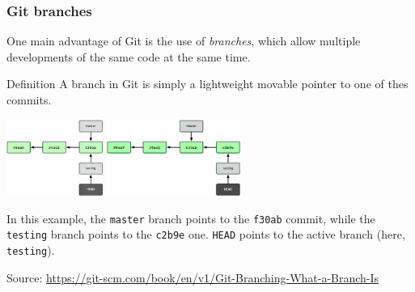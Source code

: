 \documentclass[svgnames]{beamer}
\begin{document}
\begin{frame}[fragile]
    \frametitle{Git branches}
    One main advantage of Git is the use of \emph{branches}, which allow multiple developments of the same code at the same time.

    \begin{block}{Definition}
        A branch in Git is simply a lightweight movable pointer to one of thes commits.
    \end{block}
    
    \begin{center}
        \includegraphics[height=2.5cm]{img/git-branch-ter.png}
        \hspace{3em}
        \includegraphics[height=2.5cm]{img/git-branch-bis.png}
    \end{center}

    In this example, the \verb+master+ branch points to the \verb+f30ab+ commit, while the \verb+testing+ branch points to the \verb+c2b9e+ one. \verb+HEAD+ points
    to the active branch (here, \verb+testing+).

    \vspace{1em}
    \tiny Source: \url{https://git-scm.com/book/en/v1/Git-Branching-What-a-Branch-Is}

\end{frame}
\end{document}
